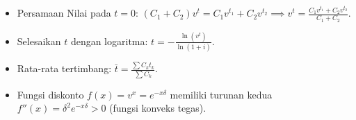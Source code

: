 \documentclass[11pt,a4paper]{article}
\begin{document}
\begin{petunjukbox}
\begin{itemize}[leftmargin=4mm, topsep=1pt, itemsep=1pt]
    \item Persamaan Nilai pada $t=0$: $(C_1 + C_2) v^t = C_1 v^{t_1} + C_2 v^{t_2} \implies v^t = \frac{C_1 v^{t_1} + C_2 v^{t_2}}{C_1 + C_2}$.
    \item Selesaikan $t$ dengan logaritma: $t = -\frac{\ln(v^t)}{\ln(1+i)}$.
    \item Rata-rata tertimbang: $\bar{t} = \frac{\sum C_k t_k}{\sum C_k}$.
    \item Fungsi diskonto $f(x) = v^x = e^{-x \delta}$ memiliki turunan kedua $f''(x) = \delta^2 e^{-x \delta} > 0$ (fungsi konveks tegas).
\end{itemize}
\end{petunjukbox}
\end{document}
